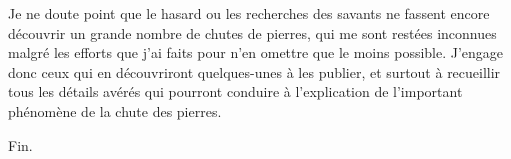 \documentclass[a4paper, 12pt, oneside, french]{article}
\begin{document}
Je ne doute point que le hasard ou les recherches des savants ne fassent encore découvrir un grande nombre de chutes de pierres, qui me sont restées inconnues malgré les efforts que j'ai faits pour n'en omettre que le moins possible. J'engage donc ceux qui en découvriront quelques-unes à les publier, et surtout à recueillir tous les détails avérés qui pourront conduire à l'explication de l'important phénomène de la chute des pierres.

Fin.
\end{document}
